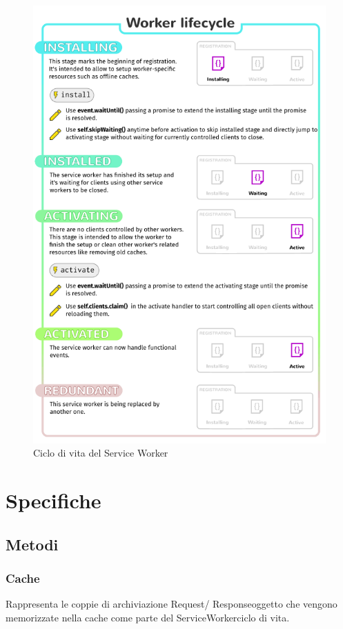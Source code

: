 \documentclass[italian]{article}
\begin{document}
\begin{figure}
	\centering
	\includegraphics[width=1\linewidth]{SwLifecycle}
	\caption{Ciclo di vita del Service Worker}
	\label{fig:Ciclo di vita del Service Worker}
\end{figure}


\section{Specifiche}
\subsection{Metodi}
\subsubsection{Cache}
Rappresenta le coppie di archiviazione Request/ Responseoggetto che vengono memorizzate nella cache come parte del ServiceWorkerciclo di vita.
\end{document}
